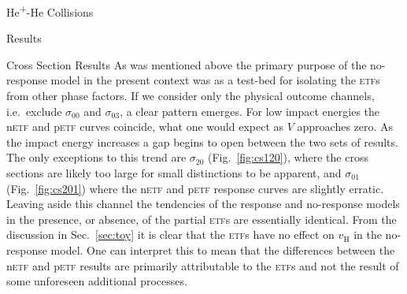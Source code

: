 \documentclass[letterpaper, 11 pt]{report}
\begin{document}
\begin{chapter}{\texorpdfstring{He\textsuperscript{+}}{He+}-He Collisions \label{chap:hephe}}
\begin{section}{Results \label{sec:hephe-disc}}
\begin{subsection}{Cross Section Results \label{sec:hephe-res}}
         As was mentioned above the primary purpose of the no-response model in the present context was
         as a test-bed for isolating the \textsc{etf}s from other phase factors. If we consider only the
         physical outcome channels, i.e.\ exclude $\sigma_{00}$ and $\sigma_{03}$, a clear pattern
         emerges. For low impact energies the n\textsc{etf} and p\textsc{etf} curves coincide, what one
         would expect as $V$ approaches zero. As the impact energy increases a gap begins to open
         between the two sets of results. The only exceptions to this trend are $\sigma_{20}$
         (Fig.~\ref{fig:cs120}), where the cross sections are likely too large for small distinctions to
         be apparent, and $\sigma_{01}$ (Fig.~\ref{fig:cs201}) where the n\textsc{etf} and p\textsc{etf}
         response curves are slightly erratic. Leaving aside this channel the tendencies of the response
         and no-response models in the presence, or absence, of the partial \textsc{etf}s are
         essentially identical. From the discussion in Sec.~\ref{sec:toy} it is clear that the
         \textsc{etf}s have no effect on $v_\mathrm{H}$ in the no-response model. One can interpret this
         to mean that the differences between the n\textsc{etf} and p\textsc{etf} results are primarily
         attributable to the \textsc{etf}s and not the result of some unforeseen additional processes.


\end{subsection}
\end{section}
\end{chapter}
\end{document}
